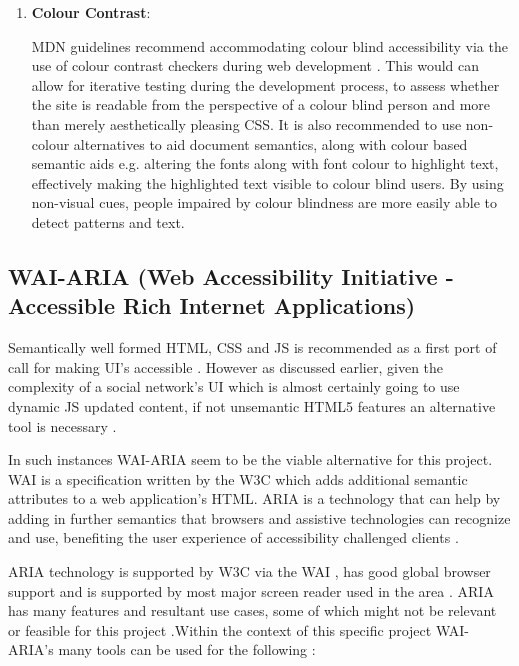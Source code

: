 \begin{enumerate}
    \item \textbf{Colour Contrast}:
    
    
    MDN guidelines recommend accommodating  colour blind accessibility via the use of colour contrast checkers during web development \cite{Mills}. This would can allow for iterative testing during the development process, to assess whether the site is readable from the perspective of a colour blind person and more than merely aesthetically pleasing CSS. It is also recommended to use non-colour alternatives  to aid document semantics, along with colour based semantic aids \cite{Mills} e.g. altering the fonts along with font colour to highlight text, effectively making the highlighted text visible to colour blind users. By using non-visual cues, people impaired by colour blindness are more easily able to detect patterns and text.
    
\end{enumerate}

\subsection{WAI-ARIA (Web Accessibility Initiative - Accessible Rich Internet Applications)}

Semantically well formed HTML, CSS and JS is recommended as a first port of call for making UI's accessible \cite{Sukardi2016}. However as discussed earlier, given the complexity of a social network's UI which is almost certainly going to use  dynamic JS updated content, if not unsemantic HTML5 features an alternative tool is necessary \cite{Sukardi2016}.


In such instances WAI-ARIA  \cite{W3C,February2016a,Sukardi2016} seem to be the viable alternative for this project. WAI is a specification written by the W3C \cite{W3C,Sukardi2016} which adds additional semantic attributes to a web application's HTML. ARIA is a technology that can help  by adding in further semantics that browsers and assistive technologies can recognize and use, benefiting the user experience of accessibility challenged clients \cite{W3C,Sukardi2016}. 

ARIA technology is supported by W3C via the WAI \cite{W3C,February2016a}, has good global browser support \cite{Sukardi2016} and is supported by most major screen reader used in the area \cite{Sukardi2016}. ARIA has many features and resultant use cases, some of which might not be relevant or feasible for this project \cite{February2016a}.Within the context of this specific project WAI-ARIA's many tools can be used for the following :

